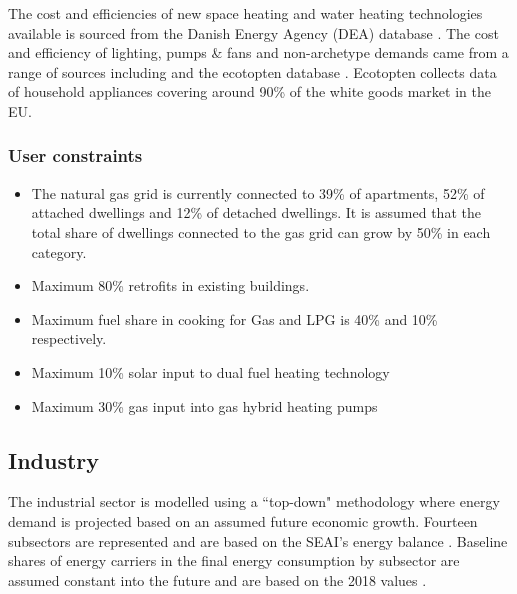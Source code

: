\documentclass[journal abbreviation, manuscript]{copernicus}
\begin{document}
The cost and efficiencies of new space heating and water heating technologies available is sourced from the Danish Energy Agency (DEA) database \cite{Energinet2018}. The cost and efficiency of lighting, pumps \& fans and non-archetype demands came from a range of sources including
\cite{SEAISustainableAuthorityofIreland2018} and the ecotopten database \cite{ecotopten}. Ecotopten collects data of household appliances covering around 90\% of the white goods market in the EU.

\subsubsection{User constraints}
\begin{itemize}
 \item The natural gas grid is currently connected to 39\% of apartments, 52\% of attached dwellings and 12\% of detached dwellings. It is assumed that the total share of dwellings connected to the gas grid can grow by 50\% in each category. 
\item Maximum 80\% retrofits in existing buildings.
\item Maximum fuel share in cooking for Gas and LPG is 40\% and 10\% respectively.
\item Maximum 10\% solar input to dual fuel heating technology
\item Maximum 30\% gas input into gas hybrid heating pumps

\end{itemize}



\subsection{Industry}
\label{ss:industry}
The industrial sector is modelled using a ``top-down" methodology where energy demand is projected based on an assumed future economic growth. Fourteen subsectors are represented and are based on the SEAI's energy balance \cite{SEAI2019}. Baseline shares of energy carriers in the final energy consumption by subsector are assumed constant into the future and are based on the 2018 values \cite{SEAI2019}. 
\end{document}
